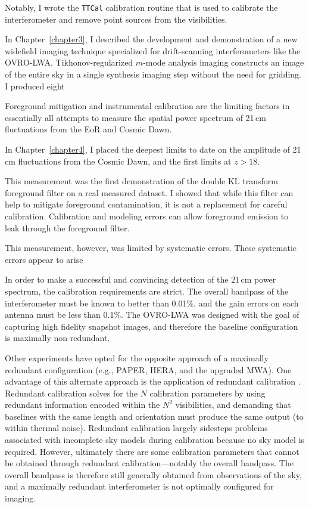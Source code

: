 \begin{bibunit}
Notably, I wrote the \texttt{TTCal} calibration routine that is used to calibrate the interferometer
and remove point sources from the visibilities.

In Chapter~\ref{chapter3}, I described the development and demonstration of a new widefield imaging
technique specialized for drift-scanning interferometers like the OVRO-LWA. Tikhonov-regularized
$m$-mode analysis imaging constructs an image of the entire sky in a single synthesis imaging step
without the need for gridding. I produced eight 

Foreground mitigation and instrumental calibration are the limiting factors in essentially all
attempts to measure the spatial power spectrum of 21\,cm fluctuations from the EoR and Cosmic Dawn.

In Chapter~\ref{chapter4}, I placed the deepest limits to date on the amplitude of 21\,cm
fluctuations from the Cosmic Dawn, and the first limits at $z > 18$.

This measurement was the first demonstration of the double KL transform foreground filter on a real
measured dataset. I showed that while this filter can help to mitigate foreground contamination, it
is not a replacement for careful calibration. Calibration and modeling errors can allow foreground
emission to leak through the foreground filter.

This measurement, however, was limited by systematic errors. These systematic errors appear to arise

In order to make a successful and convincing detection of the 21\,cm power spectrum, the calibration
requirements are strict. The overall bandpass of the interferometer must be known to better than
0.01\%, and the gain errors on each antenna must be less than 0.1\%. The OVRO-LWA was designed with
the goal of capturing high fidelity snapshot images, and therefore the baseline configuration is
maximally non-redundant.

Other experiments have opted for the opposite approach of a maximally redundant configuration (e.g.,
PAPER, HERA, and the upgraded MWA). One advantage of this alternate approach is the application of
redundant calibration \citep{2010MNRAS.408.1029L}. Redundant calibration solves for the $N$
calibration parameters by using redundant information encoded within the $N^2$ visibilities, and
demanding that baselines with the same length and orientation must produce the same output (to
within thermal noise). Redundant calibration largely sidesteps problems associated with incomplete
sky models during calibration because no sky model is required. However, ultimately there are some
calibration parameters that cannot be obtained through redundant calibration---notably the overall
bandpass. The overall bandpass is therefore still generally obtained from observations of the sky,
and a maximally redundant interferometer is not optimally configured for imaging.


\end{bibunit}
